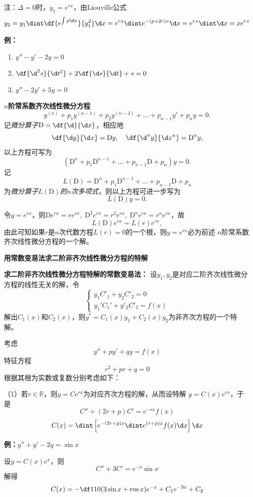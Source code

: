 注：$\Delta=0$时，$y_1=e^{rx}$，由Liouville公式
$$y_2=y_1\dint\df{e^{\int p\d x}}{y_1^2}\d x
=e^{rx}\dint e^{-(p+2r)x}\d x=e^{rx}\dint\d x=xe^{rx}$$

{\bf 例：}
\begin{enumerate}[(1)]
  \setlength{\itemindent}{1cm}
  \item $y''-y'-2y=0$
  \item $\df{\d^2s}{\d t^2}+2\df{\d s}{\d t}+s=0$
  \item $y''-2y'+5y=0$
\end{enumerate}

\begin{shaded}
	{\bf $n$阶常系数齐次线性微分方程}
	$$y^{(n)}+p_1y^{(n-1)}+p_2y^{(n-2)}+\ldots+p_{n-1}y'+p_ny=0.$$
	记{\it 微分算子}$\mathrm{D}=\df{\d}{\d x}$，相应地
	$$\df{\d y}{\d x}=\mathrm{D}y,\quad \df{\d^n y}{\d x^n}=\mathrm{D}^ny,$$
	以上方程可写为
	$$(\mathrm{D}^n+p_1\mathrm{D}^{n-1}+\ldots+p_{n-1}\mathrm{D}
	+p_n)y=0.$$
	记
	$$L(\mathrm{D})=\mathrm{D}^n+p_1\mathrm{D}^{n-1}+\ldots+p_{n-1}\mathrm{D}
	+p_n$$
	为{\it 微分算子$L(\mathrm{D})$的$n$次多项式}，则以上方程可进一步写为
	$$L(\mathrm{D})y=0.$$
	
	令$y=e^{rx}$，则$\mathrm{D}e^{rx}=re^{rx},\;\mathrm{D}^2e^{rx}=r^2e^{rx},
	\;\mathrm{D}^ne^{rx}=r^ne^{rx}$，故
	$$L(\mathrm{D})e^{rx}=L(r)e^{rx},$$
	由此可知如果$r$是$n$次代数方程$L(r)=0$的一个根，则$y=e^{rx}$必为前述
	$n$阶常系数齐次线性微分方程的一个解。

	{\bf 用常数变易法求二阶非齐次线性微分方程的特解}
	
	\begin{tcolorbox}
		{\bf 求二阶非齐次线性微分方程特解的常数变易法：}
		设$y_1,y_2$是对应二阶齐次线性微分方程的线性无关的解，令	
		$$
		\left\{\begin{array}{l}
		y_1C'_1+y_2C'_2=0\\
		y_1'C_1'+y'_2C'_2=f(x)
		\end{array}\right.
		$$
		解出$C_1(x)$和$C_2(x)$，则$y^*=C_1(x)y_1+C_2(x)y_2$为非齐次方程的一个特解。
	\end{tcolorbox}
	
	考虑
	$$y''+py'+qy=f(x)$$
	特征方程
	$$r^2+pr+q=0$$
	根据其根为实数或复数分别考虑如下：
	
	（1）若$r\in\mathbb{R}$，则$y=Ce^{rx}$为对应齐次方程的解，从而设特解
	$y=C(x)e^{rx}$，于是
	$$C''+(2r+p)C'=e^{-rx}f(x)$$
	$$C(x)=\dint\left[e^{-(2r+p)x}\dint e^{(r+p)x}f(x)\d x\right]\d x$$
	
	{\bf 例：}$y''+y'-2y=\sin x$
	
	设$y=C(x)e^x$，则
	$$C''+3C'=e^{-x}\sin x$$
	解得
	$$C(x)=-\df1{10}(3\sin x+\cos x)e^{-x}+C_1e^{-3x}+C_2$$
	

\end{shaded}
